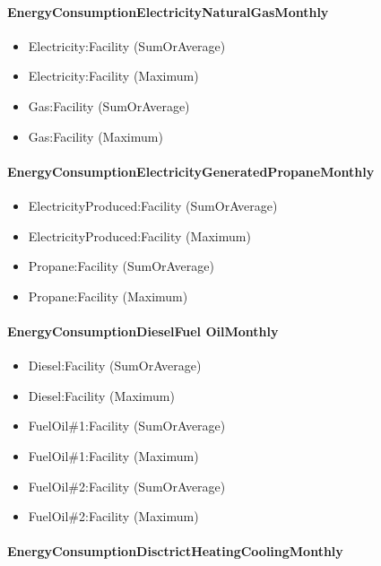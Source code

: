 \paragraph{EnergyConsumptionElectricityNaturalGasMonthly}\label{energyconsumptionelectricitynaturalgasmonthly}

\begin{itemize}
\item
  Electricity:Facility (SumOrAverage)
\item
  Electricity:Facility (Maximum)
\item
  Gas:Facility (SumOrAverage)
\item
  Gas:Facility (Maximum)
\end{itemize}

\paragraph{EnergyConsumptionElectricityGeneratedPropaneMonthly}\label{energyconsumptionelectricitygeneratedpropanemonthly}

\begin{itemize}
\item
  ElectricityProduced:Facility (SumOrAverage)
\item
  ElectricityProduced:Facility (Maximum)
\item
  Propane:Facility (SumOrAverage)
\item
  Propane:Facility (Maximum)
\end{itemize}

\paragraph{EnergyConsumptionDieselFuel OilMonthly}\label{energyconsumptiondieselfuel-oilmonthly}

\begin{itemize}
\item
  Diesel:Facility (SumOrAverage)
\item
  Diesel:Facility (Maximum)
\item
  FuelOil\#1:Facility (SumOrAverage)
\item
  FuelOil\#1:Facility (Maximum)
\item
  FuelOil\#2:Facility (SumOrAverage)
\item
  FuelOil\#2:Facility (Maximum)
\end{itemize}

\paragraph{EnergyConsumptionDisctrictHeatingCoolingMonthly}\label{energyconsumptiondisctrictheatingcoolingmonthly}

